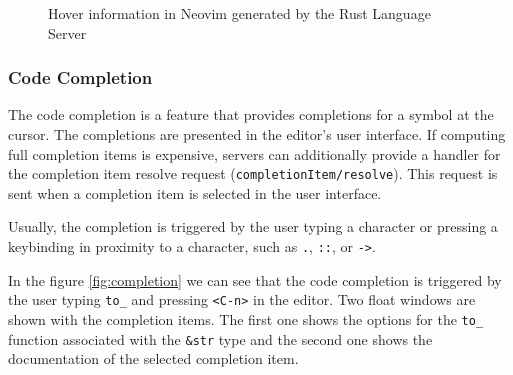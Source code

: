 \begin{figure}[t]
    \centering
    \caption{Hover information in Neovim generated by the Rust Language Server}
    \label{fig:hover}
\end{figure}

\subsubsection{Code Completion}\label{subsubsec:background:CodeCompletion}
\hfill \break

The code completion is a feature that provides completions for a symbol at the cursor. The completions are presented in the editor's user interface. If computing full completion items is expensive, servers can additionally provide a handler for the completion item resolve request (\texttt{completionItem/resolve}). This request is sent when a completion item is selected in the user interface.

Usually, the completion is triggered by the user typing a character or pressing a keybinding in proximity to a character, such as \texttt{.}, \texttt{::}, or \texttt{->}.

In the figure \ref{fig:completion} we can see that the code completion is triggered by the user typing \texttt{to\_} and pressing \texttt{<C-n>} in the editor. Two float windows are shown with the completion items. The first one shows the options for the \texttt{to\_} function associated with the \texttt{\&str} type and the second one shows the documentation of the selected completion item.

